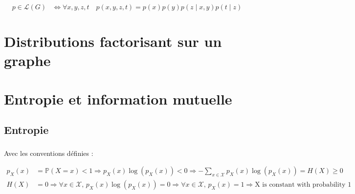 \documentclass[12pt,a4paper,onecolumn]{article}
\begin{document}
\begin{equation}
	\begin{split}
		p \in \mathcal{L}(G) &\Leftrightarrow \forall x, y, z, t \quad p(x, y, z, t) = p(x)p(y)p(z \mid  x, y) p(t \mid z)
	\end{split}
\end{equation}



\subsection{}


\section{Distributions factorisant sur un graphe}

\subsection{}


\subsection{}


\clearpage

\section{Entropie et information mutuelle}

\subsection{Entropie}

\subsubsection{}

Avec les conventions définies :

\begin{equation}
	\begin{split}
		p_X(x) &= \mathbb{P}(X = x) < 1 \Rightarrow p_X(x)\log(p_X(x)) < 0 \Rightarrow -\sum_{x \in \mathcal{X}} p_X(x)\log(p_X(x)) = H(X) \geq 0 \\
		H(X) &= 0 \Rightarrow \forall x \in \mathcal{X},\, p_X(x)\log(p_X(x)) = 0 \Rightarrow \forall x \in \mathcal{X},\, p_X(x) = 1 \Rightarrow \text{X is constant with probability 1}
	\end{split}
	\label{eq_31a}
\end{equation}
\end{document}
